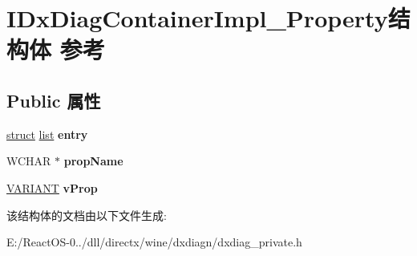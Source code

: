 \hypertarget{struct_i_dx_diag_container_impl___property}{}\section{I\+Dx\+Diag\+Container\+Impl\+\_\+\+Property结构体 参考}
\label{struct_i_dx_diag_container_impl___property}
\subsection*{Public 属性}
\begin{DoxyCompactItemize}
\item 
\mbox{\label{struct_i_dx_diag_container_impl___property_a548a0d87db93e33cd82f016642250f74}} 
\hyperlink{interfacestruct}{struct} \hyperlink{classlist}{list} {\bfseries entry}
\item 
\mbox{\label{struct_i_dx_diag_container_impl___property_a53a0b2dfcdea23c81786f91f6dcad79f}} 
W\+C\+H\+AR $\ast$ {\bfseries prop\+Name}
\item 
\mbox{\label{struct_i_dx_diag_container_impl___property_aea666658965755528e3d38f112cff80e}} 
\hyperlink{structtag_v_a_r_i_a_n_t}{V\+A\+R\+I\+A\+NT} {\bfseries v\+Prop}
\end{DoxyCompactItemize}


该结构体的文档由以下文件生成\+:\begin{DoxyCompactItemize}
\item 
E\+:/\+React\+O\+S-\/0../dll/directx/wine/dxdiagn/dxdiag\+\_\+private.\+h\end{DoxyCompactItemize}
